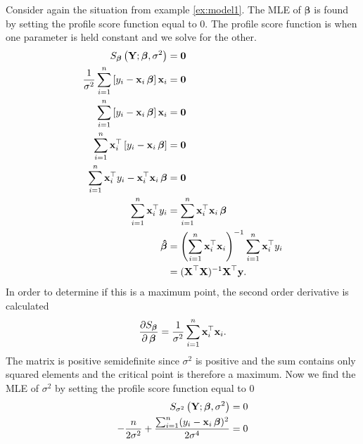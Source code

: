 \begin{example} \label{ex:MLE_for_model}
Consider again the situation from example \ref{ex:model1}. The MLE of $\boldsymbol{\beta}$ is found by setting the profile score function equal to $0$. The profile score function is when one parameter is held constant and we solve for the other. 
\begin{align*}
    S_{\boldsymbol{\beta}}\left(\textbf{Y}; \boldsymbol{\beta}, \sigma^2 \right) &= \mathbf{0} \\
    \frac{1}{\sigma^2}\sum_{i=1}^n \left[ y_i - \textbf{x}_i \operatorname{\boldsymbol{\beta}} \right] \textbf{x}_i &= \mathbf{0} \\
    \sum_{i=1}^n \left[ y_i - \textbf{x}_i \operatorname{\boldsymbol{\beta}} \right] \textbf{x}_i &= \mathbf{0} \\
    \sum_{i=1}^n \textbf{x}_i^\top \left[ y_i - \textbf{x}_i \operatorname{\boldsymbol{\beta}} \right] &= \mathbf{0} \\
    \sum_{i=1}^n  \textbf{x}_i^\top y_i - \textbf{x}_i^\top \textbf{x}_i \operatorname{\boldsymbol{\beta}} &= \mathbf{0} \\
    \sum_{i=1}^n  \textbf{x}_i^\top y_i &= \sum_{i=1}^n \textbf{x}_i^\top \textbf{x}_i \operatorname{\boldsymbol{\beta}} \\
    \operatorname{\boldsymbol{\hat{\beta}}} &= \left( \sum_{i=1}^n \textbf{x}_i^\top \textbf{x}_i \right)^{-1} \sum_{i=1}^n  \textbf{x}_i^\top y_i \\
    &= (\textbf{X}^\top\textbf{X})^{-1}\textbf{X}^\top \textbf{y}.
\end{align*}
In order to determine if this is a maximum point, the second order derivative is calculated
\begin{align}\label{eq:expected_informtion_beta}
    \frac{\partial S_{\operatorname{\boldsymbol{\beta}}}}{\partial \operatorname{\boldsymbol{\beta}}} = \frac{1}{\sigma^2}\sum_{i=1}^n \textbf{x}_i^\top \textbf{x}_i.
\end{align}
The matrix is positive semidefinite since $\sigma^2$ is positive and the sum contains only squared elements and the critical point is therefore a maximum.
Now we find the MLE of $\sigma^2$ by setting the profile score function equal to $0$
\begin{align*}
     S_{\sigma^2}\left(\textbf{Y}; \boldsymbol{\beta}, \sigma^2 \right) &= 0 \\
      - \dfrac{n}{2 \sigma^2} + \dfrac{\sum_{i=1}^n (y_i -  \textbf{x}_i \betabold)^2}{2 \sigma^4} &= 0 \\

\end{align*}
\end{example}
